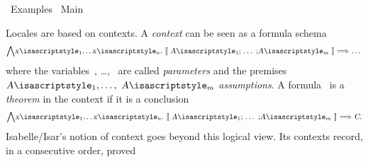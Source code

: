 %
\begin{isabellebody}%
\def\isabellecontext{Examples}%
%
\isadelimtheory
%
\endisadelimtheory
%
\isatagtheory
{}\isamarkupfalse%
\ Examples\isanewline
{}\ Main\isanewline
{}%
\endisatagtheory
{\isafoldtheory}%
%
\isadelimtheory
\isanewline
%
\endisadelimtheory
%
\isadeliminvisible
\isanewline
%
\endisadeliminvisible
%
\isataginvisible
{}\isamarkupfalse%
\ {}{}%
\endisataginvisible
{\isafoldinvisible}%
%
\isadeliminvisible
%
\endisadeliminvisible
%
\isamarkuptrue%
%
\begin{isamarkuptext}%
Locales are based on contexts.  A \emph{context} can be seen as a
  formula schema
\[
  \isa{{\isaliteral{5C3C416E643E}{\isasymAnd}}x\isaliteral{5C3C5E7375623E}{}\isactrlsub {\isadigit{1}}{\isaliteral{5C3C646F74733E}{\isasymdots}}x\isaliteral{5C3C5E7375623E}{}\isactrlsub n{\isaliteral{2E}{\isachardot}}\ {\isaliteral{5C3C6C6272616B6B3E}{\isasymlbrakk}}\ A\isaliteral{5C3C5E7375623E}{}\isactrlsub {\isadigit{1}}{\isaliteral{3B}{\isacharsemicolon}}\ {\isaliteral{5C3C646F74733E}{\isasymdots}}\ {\isaliteral{3B}{\isacharsemicolon}}A\isaliteral{5C3C5E7375623E}{}\isactrlsub m\ {\isaliteral{5C3C726272616B6B3E}{\isasymrbrakk}}\ {\isaliteral{5C3C4C6F6E6772696768746172726F773E}{\isasymLongrightarrow}}\ {\isaliteral{5C3C646F74733E}{\isasymdots}}}
\]
  where the variables~, \ldots,~ are called
  \emph{parameters} and the premises $\isa{A\isaliteral{5C3C5E7375623E}{}\isactrlsub {\isadigit{1}}}, \ldots,~\isa{A\isaliteral{5C3C5E7375623E}{}\isactrlsub m}$ \emph{assumptions}.  A formula~
  is a \emph{theorem} in the context if it is a conclusion
\[
  \isa{{\isaliteral{5C3C416E643E}{\isasymAnd}}x\isaliteral{5C3C5E7375623E}{}\isactrlsub {\isadigit{1}}{\isaliteral{5C3C646F74733E}{\isasymdots}}x\isaliteral{5C3C5E7375623E}{}\isactrlsub n{\isaliteral{2E}{\isachardot}}\ {\isaliteral{5C3C6C6272616B6B3E}{\isasymlbrakk}}\ A\isaliteral{5C3C5E7375623E}{}\isactrlsub {\isadigit{1}}{\isaliteral{3B}{\isacharsemicolon}}\ {\isaliteral{5C3C646F74733E}{\isasymdots}}\ {\isaliteral{3B}{\isacharsemicolon}}A\isaliteral{5C3C5E7375623E}{}\isactrlsub m\ {\isaliteral{5C3C726272616B6B3E}{\isasymrbrakk}}\ {\isaliteral{5C3C4C6F6E6772696768746172726F773E}{\isasymLongrightarrow}}\ C}.
\]
  Isabelle/Isar's notion of context goes beyond this logical view.
  Its contexts record, in a consecutive order, proved

\end{isamarkuptext}
\end{isabellebody}
